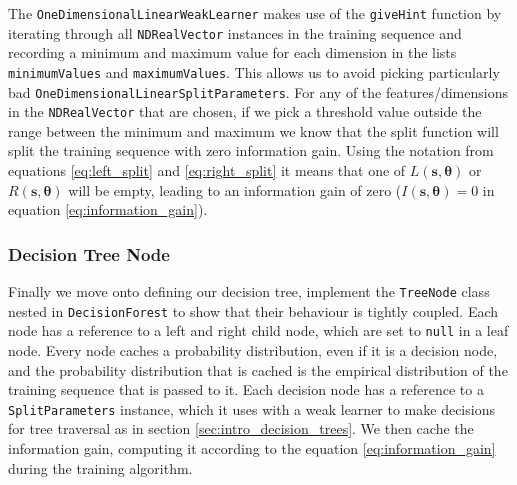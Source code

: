 \documentclass[12pt,twoside,notitlepage]{report}
\newcommand{\vc}[1]{\mathbf{#1}}
\begin{document}
                The \texttt{OneDimensionalLinearWeakLearner} makes use of the \texttt{giveHint} function by iterating through 
                all \texttt{NDRealVector} instances in the training sequence and recording a minimum and maximum value 
                for each dimension in the lists \texttt{minimumValues} and \texttt{maximumValues}. This  
                allows us to avoid picking particularly bad \texttt{OneDimensionalLinearSplitParameters}. 
                For any of the features/dimensions in the \texttt{NDRealVector} 
                that are chosen, if we pick a threshold value outside the range between the minimum and maximum we know that 
                the split function will split the training sequence with zero information gain. Using the notation from 
                equations \ref{eq:left_split} and \ref{eq:right_split} it means that one of $L(\vc{s},\vc{\theta})$ or 
                $R(\vc{s},\vc{\theta})$ will be empty, leading to an information gain of zero ($I(\vc{s},\vc{\theta}) = 0$ 
                in equation \ref{eq:information_gain}).




            \subsubsection{Decision Tree Node}
                Finally we move onto defining our decision tree, implement the \texttt{TreeNode} class nested in 
                \texttt{DecisionForest} to show that their behaviour is tightly coupled. Each node has a reference 
                to a left and right child node, which are set to \texttt{null} in a leaf node. Every node caches a 
                probability distribution, even if it is a decision node, and the 
                probability distribution that is cached is the empirical distribution of the training sequence that is 
                passed to it. Each decision node has a reference to a \texttt{SplitParameters} instance, which it 
                uses with a weak learner to make decisions for tree traversal as in section 
                \ref{sec:intro_decision_trees}. We then cache the information gain, computing it according to the 
                equation \ref{eq:information_gain} during the training algorithm.
\end{document}

